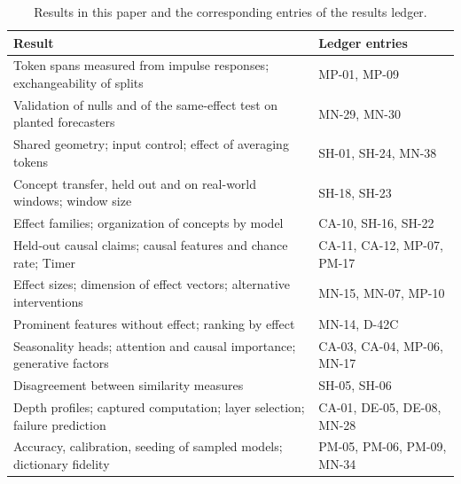 \documentclass[twoside,11pt]{article}
\begin{document}
\begin{table}[!tb]
\centering
\small
\begin{tabularx}{\textwidth}{@{}>{\raggedright\arraybackslash}Xl@{}}
\toprule
Result & Ledger entries \\
\midrule
Token spans measured from impulse responses; exchangeability of splits & MP-01, MP-09 \\
Validation of nulls and of the same-effect test on planted forecasters & MN-29, MN-30 \\
Shared geometry; input control; effect of averaging tokens & SH-01, SH-24, MN-38 \\
Concept transfer, held out and on real-world windows; window size & SH-18, SH-23 \\
Effect families; organization of concepts by model & CA-10, SH-16, SH-22 \\
Held-out causal claims; causal features and chance rate; Timer & CA-11, CA-12, MP-07, PM-17 \\
Effect sizes; dimension of effect vectors; alternative interventions & MN-15, MN-07, MP-10 \\
Prominent features without effect; ranking by effect & MN-14, D-42C \\
Seasonality heads; attention and causal importance; generative factors & CA-03, CA-04, MP-06, MN-17 \\
Disagreement between similarity measures & SH-05, SH-06 \\
Depth profiles; captured computation; layer selection; failure prediction & CA-01, DE-05, DE-08, MN-28 \\
Accuracy, calibration, seeding of sampled models; dictionary fidelity & PM-05, PM-06, PM-09, MN-34 \\
\bottomrule
\end{tabularx}
\caption{Results in this paper and the corresponding entries of the results ledger.}
\label{tab:ledger}
\end{table}

\FloatBarrier

{\small\setlength{\bibsep}{2pt}}
\end{document}
